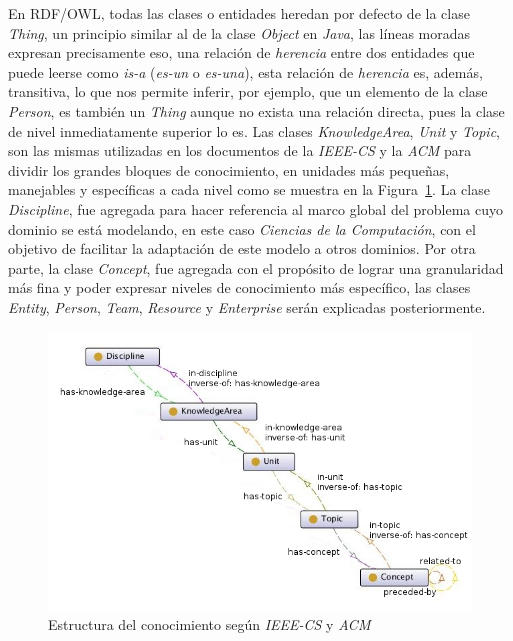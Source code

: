 \begin{itemize}
En RDF/OWL, todas las clases o entidades heredan por defecto de la clase \textit{Thing}, un principio similar al de la clase \textit{Object} en \textit{Java}, las líneas moradas expresan precisamente eso, una relación de \textit{herencia} entre dos entidades que puede leerse como \textit{is-a} (\textit{es-un} o \textit{es-una}), esta relación de \textit{herencia} es, además, transitiva, lo que nos permite inferir, por ejemplo, que un elemento de la clase \textit{Person}, es también un \textit{Thing} aunque no exista una relación directa, pues la clase de nivel inmediatamente superior lo es. Las clases \textit{KnowledgeArea}, \textit{Unit} y \textit{Topic}, son las mismas utilizadas en los documentos de la \textit{IEEE-CS} y la \textit{ACM} para dividir los grandes bloques de conocimiento, en unidades más pequeñas, manejables y específicas a cada nivel como se muestra en la Figura~\ref{knowledgeStructure}. La clase \textit{Discipline}, fue agregada para hacer referencia al marco global del problema cuyo dominio se está modelando, en este caso \textit{Ciencias de la Computación}, con el objetivo de facilitar la adaptación de este modelo a otros dominios. Por otra parte, la clase \textit{Concept}, fue agregada con el propósito de lograr una granularidad más fina y poder expresar niveles de conocimiento más específico, las clases \textit{Entity}, \textit{Person}, \textit{Team}, \textit{Resource} y \textit{Enterprise} serán explicadas posteriormente.

\begin{figure}[h!]
    \begin{center}
        \includegraphics[scale=0.5]{images/onto_knowledge_structure.jpg}
        \caption{Estructura del conocimiento según \textit{IEEE-CS} y \textit{ACM}}
        \label{knowledgeStructure}
    \end{center}
\end{figure}


\end{itemize}
